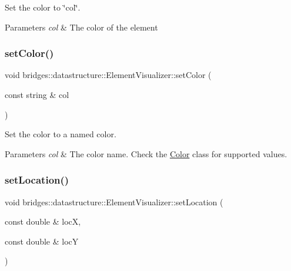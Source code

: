 Set the color to \char`\"{}col\char`\"{}. 


\begin{DoxyParams}{Parameters}
{\em col} & The color of the element \\
\hline
\end{DoxyParams}
\mbox{\label{classbridges_1_1datastructure_1_1_element_visualizer_a0068ebe250375b13c5b3d4af0df20dea}} 
\subsubsection{\texorpdfstring{set\+Color()}{setColor()}\hspace{0.1cm}{\footnotesize\ttfamily [2/2]}}
{\footnotesize\ttfamily void bridges\+::datastructure\+::\+Element\+Visualizer\+::set\+Color (\begin{DoxyParamCaption}\item[{const string \&}]{col }\end{DoxyParamCaption})\hspace{0.3cm}{\ttfamily [inline]}}



Set the color to a named color. 


\begin{DoxyParams}{Parameters}
{\em col} & The color name. Check the \hyperlink{classbridges_1_1datastructure_1_1_color}{Color} class for supported values. \\
\hline
\end{DoxyParams}
\mbox{\label{classbridges_1_1datastructure_1_1_element_visualizer_ae980cb185ddb11ecd1cebeb4834734bf}} 
\subsubsection{\texorpdfstring{set\+Location()}{setLocation()}}
{\footnotesize\ttfamily void bridges\+::datastructure\+::\+Element\+Visualizer\+::set\+Location (\begin{DoxyParamCaption}\item[{const double \&}]{locX,  }\item[{const double \&}]{locY }\end{DoxyParamCaption})\hspace{0.3cm}{\ttfamily [inline]}}

